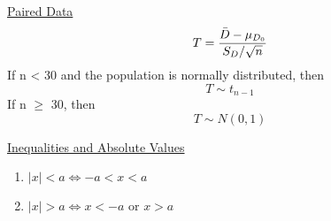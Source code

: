 \documentclass[a4paper,1pt,landscape]{article}
\begin{document}
\begin{multicols}{3}
\underline{Paired Data}
$$T = \frac{\Bar{D}-\mu_{D_0}}{S_D/\sqrt{n}}$$
If n < 30 and the population is normally distributed, then
$$T\sim t_{n-1}$$
If n $\geq$ 30, then
$$T\sim N(0,1)$$

\underline{Inequalities and Absolute Values}
\begin{enumerate}
    \item $|x| < a \Longleftrightarrow -a < x < a$
    \item $|x| > a \Longleftrightarrow x < -a \text{ or } x > a$
\end{enumerate}











\end{multicols}
\end{document}
